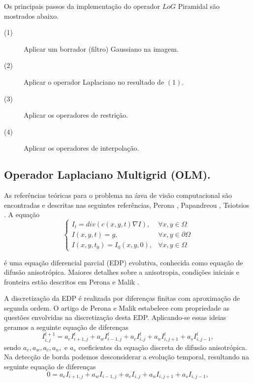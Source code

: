 \documentclass[a4paper]{article} %
\begin{document}
Os principais passos da implementação do operador $LoG$ Piramidal são mostrados abaixo.

\begin{description}
\item[(1)] Aplicar um borrador (filtro) Gaussiano  na imagem.
\item[(2)] Aplicar o operador Laplaciano no resultado de $(1)$.
\item[(3)] Aplicar os operadores de restrição.
\item[(4)] Aplicar os operadores de interpolação.
\end{description}


\subsection{Operador Laplaciano Multigrid (OLM).}

As referências teóricas para o problema na área de visão computacional são encontradas e descritas nas seguintes referências, Perona \cite{perona1990scale}, Papandreou \cite{papandreou2007multigrid}, Tsiotsios \cite{tsiotsios2013anisotropic}. A equação
\begin{equation}\label{eq1}
\left\{\begin{array}{lc}
I_t=div(c(x,y,t)\nabla I), & \forall x,y\in \Omega\\
I(x,y,t)=g, & \forall x,y\in\partial{\Omega}\\
I(x,y,t_0)=I_0(x,y,0), & \forall x,y\in \Omega
\end{array}
\right.
\end{equation}

é uma equação diferencial parcial (EDP) evolutiva, conhecida como equação de difusão anisotrópica. Maiores detalhes sobre a anisotropia, condições iniciais e fronteira estão descritos em Perona e Malik \cite{perona1990scale}.

A discretização da EDP é realizada por diferenças finitas com aproximação de segunda ordem. O artigo de Perona e Malik \cite{perona1990scale} estabelece com propriedade as questões envolvidas na discretização desta EDP. Aplicando-se essas ideias geramos a seguinte equação de diferenças
\begin{equation}\label{eq2}
 I_{i,j}^{t+1} = a_eI_{i+1,j}^{t}+a_wI_{i-1,j}^{t}+a_cI_{i,j}^{t}+a_nI_{i,j+1}^{t}+a_sI_{i,j-1}^{t},
\end{equation}
sendo $a_e,a_w,a_c,a_n,$ e $a_s$ coeficientes da equação discreta de difusão anisotrópica. Na detecção de borda podemos desconsiderar a evolução temporal, resultando na seguinte equação de diferenças  
\begin{equation}\label{eq3}
0 = a_eI_{i+1,j}+a_wI_{i-1,j}+a_cI_{i,j}+a_nI_{i,j+1}+a_sI_{i,j-1},
\end{equation}
\end{document}
